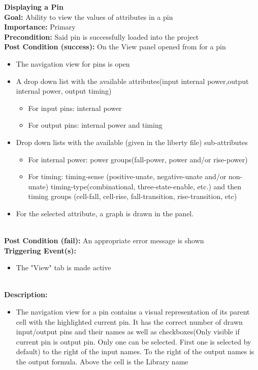 \documentclass[10pt,a4paper]{report}
\newcommand{\precondition}[1]{
    \textbf{Precondition: } #1 \leavevmode \\
}
\newcommand{\FRDescription}[8]{
    \textbf{#1} \leavevmode \\
    \textbf{Goal: } #2 \leavevmode \\
    \textbf{Importance: } #3 \leavevmode \\
    \precondition{#4}
    \textbf{Post Condition (success): } #5 \leavevmode \\
    \textbf{Post Condition (fail): } #6 \leavevmode \\
    \textbf{Triggering Event(s): } #7 \leavevmode \\
    \textbf{Description: } \leavevmode \\ 
    #8}
\begin{document}
\begin{FR}
{\begin{itemize}
    \end{itemize}}
    \item \FRDescription{Displaying a Pin}
    {Ability to view the values of attributes in a pin}
    {Primary}
    {Said pin is successfully loaded into the project}
    {On the View panel opened from \label{FR-PREVIOUS} for a pin
        \begin{itemize}
            \item The navigation view for pins is open
            \item A drop down list with the available attributes(input internal power,output internal power, output timing)
            \begin{itemize}
                \item For input pins: internal power
                \item For output pins: internal power and timing
            \end{itemize}
            \item Drop down lists with the available (given in the liberty file) sub-attributes
            \begin{itemize}
                \item For internal power: power groups(fall-power, power and/or rise-power)
                \item For timing: timing-sense (positive-unate, negative-unate and/or non-unate) timing-type(combinational, three-state-enable, etc.) and then timing groups (cell-fall, cell-rise, fall-transition, rise-transition, etc)
            \end{itemize}
            \item For the selected attribute, a graph is drawn in the panel.
        \end{itemize}}
    {An appropriate error message is shown}
    {\begin{itemize}
        \item The "View" tab is made active
    \end{itemize}}
    {\begin{itemize}
        \item The navigation view for a pin contains a visual representation of its parent cell with the highlighted current pin. It has the correct number of drawn input/output pins and their names as well as checkboxes(Only visible if current pin is output pin. Only one can be selected. First one is selected by default) to the right of the input names. To the right of the output names is the output formula. Above the cell is the Library name

\end{itemize}}
\end{FR}
\end{document}
